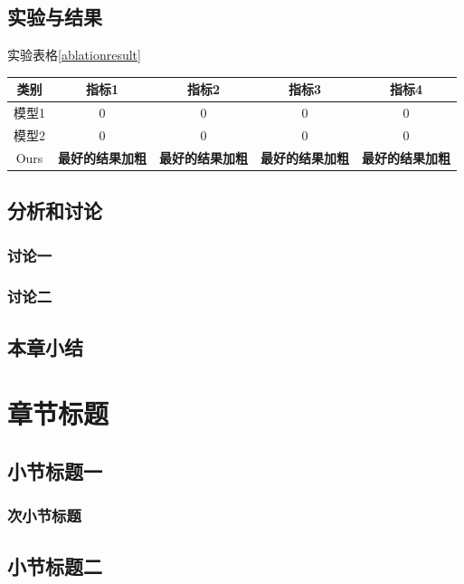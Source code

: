 \documentclass{ctexart}
\numberwithin{figure}{section}
\numberwithin{table}{section}
\numberwithin{equation}{section}
\begin{document}
\subsection{实验与结果}
实验表格\ref{ablationresult}
\begin{myTable}
	\label{ablationresult}
	\begin{tabular}{|c|c|c|c|c|}
		\hline
		类别&指标1&指标2&指标3&指标4\\ \hline
		模型1&0&0&0&0\\ \hline
		模型2&0&0&0&0\\ \hline
		Ours&\textbf{最好的结果加粗}&\textbf{最好的结果加粗}&\textbf{最好的结果加粗}&\textbf{最好的结果加粗}\\ \hline
	\end{tabular}
\end{myTable}



\subsection{分析和讨论}

\subsubsection{讨论一}


\subsubsection{讨论二}

\subsection{本章小结}

\newpage
\section{章节标题}
\subsection{小节标题一}

\subsubsection{次小节标题}


\subsection{小节标题二}
\end{document}
